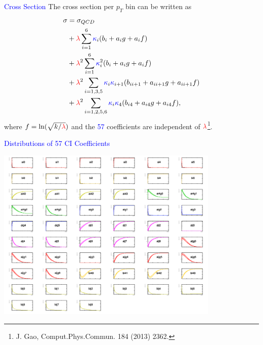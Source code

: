 \documentclass[t,professionalfonts,handout, xcolor=pdftex,dvipsnames,table]{beamer}
\newcommand{\rlambda}{\textcolor{red}{\lambda}}
\newcommand{\bkappa}{\textcolor{blue}{\kappa}}
\begin{document}
\begin{frame}
\textcolor{blue}{Cross Section}  The cross section per $p_T$ bin can be
written as
\begin{align*}
\sigma 	& = \sigma_{QCD} \\
		& + \rlambda \sum_{i=1}^6 \bkappa_i (b_i + a_i g + a_i f)\\
		& + \rlambda^2  \sum_{i=1}^6 \bkappa_i^2 (b_i + a_i g + a_i f)\\
		& + \rlambda^2 \sum_{i=1,3,5} \bkappa_i \bkappa_{i+1} (b_{ii+1} + a_{ii+1} g + a_{ii+1} f)\\
		& + \rlambda^2  \sum_{i=1,2,5,6} \bkappa_i \bkappa_{4} (b_{i4} + a_{i4} g + a_{i4} f),
\end{align*}
where 
$f = \ln(\sqrt{k / \rlambda})$ and the \textcolor{blue}{57} coefficients are independent of $\rlambda$\footnote{J. Gao, Comput.Phys.Commun. 184 (2013) 2362.}.
\end{frame}

\begin{frame}
\textcolor{blue}{Distributions of 57 CI Coefficients}
\bigskip
 
 \centerline{\includegraphics[width=0.8\textwidth]{coeff13TeV.png}}
\end{frame}

\end{document}
